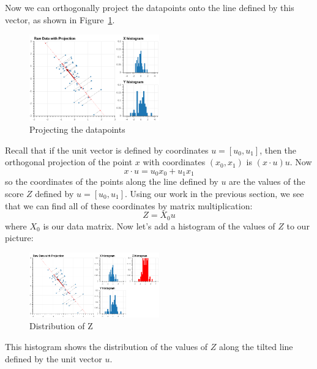 \documentclass[
  11pt,
  letterpaper,
]{scrbook}
\theoremstyle{plain}
\theoremstyle{plain}
\theoremstyle{remark}
\begin{document}
Now we can orthogonally project the datapoints onto the line defined by
this vector, as shown in Figure~\ref{fig-pcasimfig-2}.

\begin{figure}

{\centering \includegraphics[width=0.5\textwidth,height=\textheight]{chapters/img/PCAsimulated-3.png}

}

\caption{\label{fig-pcasimfig-2}Projecting the datapoints}

\end{figure}

Recall that if the unit vector is defined by coordinates
\(u=[u_0,u_1]\), then the orthogonal projection of the point \(x\) with
coordinates \((x_0,x_1)\) is \((x\cdot u)u\). Now \[
x\cdot u = u_0 x_0 + u_1 x_1
\] so the coordinates of the points along the line defined by \(u\) are
the values of the score \(Z\) defined by \(u=[u_0,u_1]\). Using our work
in the previous section, we see that we can find all of these
coordinates by matrix multiplication: \[
Z = X_0 u
\] where \(X_0\) is our data matrix. Now let's add a histogram of the
values of \(Z\) to our picture:

\begin{figure}

{\centering \includegraphics[width=0.5\textwidth,height=\textheight]{chapters/img/PCAsimulated-4.png}

}

\caption{\label{fig-pcasimfig-3}Distribution of Z}

\end{figure}

This histogram shows the distribution of the values of \(Z\) along the
tilted line defined by the unit vector \(u\).
\end{document}
